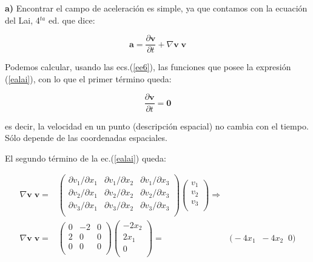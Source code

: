 \documentclass[10pt,a4paper]{article}
\begin{document}
\textbf{a)} Encontrar el campo de aceleración es simple, ya que contamos con la ecuación del Lai, 4$^{ta}$ ed. que dice:


\begin{equation}\label{ealai}
\mathbf{a} = \dfrac{\partial \mathbf{v}}{\partial t} + \nabla \mathbf{v} \; \mathbf{v}
\end{equation}

Podemos calcular, usando las ecs.(\ref{ee6}), las funciones que posee la expresión (\ref{ealai}), con lo que el primer término queda:

\begin{equation}
\dfrac{\partial \mathbf{v}}{\partial t} = \mathbf{0}
\end{equation}

\noindent es decir, la velocidad en un punto (descripción espacial) no cambia con el tiempo. Sólo depende de las coordenadas espaciales.

El segundo término de la ec.(\ref{ealai}) queda:

\begin{eqnarray}
\nonumber
\nabla \mathbf{v} \; \mathbf{v}  = &    
\begin{pmatrix}
\partial v_1 / \partial x_1 &  \partial v_1 / \partial x_2 & \partial v_1 / \partial x_3\\ 
\partial v_2 / \partial x_1 &  \partial v_2 / \partial x_2 & \partial v_2 / \partial x_3\\ 
\partial v_3 / \partial x_1 &  \partial v_3 / \partial x_2 & \partial v_3 / \partial x_3\\ 
\end{pmatrix}
\begin{pmatrix}
v_1 \\
v_2 \\
v_3 \\
\end{pmatrix}
\Rightarrow & \\ 
\nabla \mathbf{v} \; \mathbf{v}  = &  
\begin{pmatrix}
0 &  -2 & 0 \\ 
2 &  0 & 0 \\ 
0 &  0 & 0 \\ 
\end{pmatrix}
\begin{pmatrix}
-2 x_2 \\
2 x_1 \\
0 \\
\end{pmatrix}
= & 
\Big( -4x_1 \; \; -4x_2 \; \; 0 \Big)
\end{eqnarray}
\end{document}
